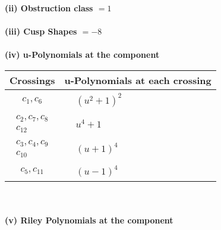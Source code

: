 \documentclass[1p]{elsarticle_modified}
\theoremstyle{definition}
\begin{document}
\flushleft \textbf{(ii) Obstruction class $= 1$}\\~\\
\flushleft \textbf{(iii) Cusp Shapes $= -8$}\\~\\
\newpage\renewcommand{\arraystretch}{1}
\flushleft \textbf{(iv) u-Polynomials at the component}\newline \\
\begin{tabular}{m{50pt}|m{274pt}}
Crossings & \hspace{64pt}u-Polynomials at each crossing \\
\hline $$\begin{aligned}c_{1},c_{6}\end{aligned}$$&$\begin{aligned}
&(u^2+1)^2
\end{aligned}$\\
\hline $$\begin{aligned}c_{2},c_{7},c_{8}\\c_{12}\end{aligned}$$&$\begin{aligned}
&u^4+1
\end{aligned}$\\
\hline $$\begin{aligned}c_{3},c_{4},c_{9}\\c_{10}\end{aligned}$$&$\begin{aligned}
&(u+1)^4
\end{aligned}$\\
\hline $$\begin{aligned}c_{5},c_{11}\end{aligned}$$&$\begin{aligned}
&(u-1)^4
\end{aligned}$\\
\hline
\end{tabular}\\~\\
\newpage\renewcommand{\arraystretch}{1}
\flushleft \textbf{(v) Riley Polynomials at the component}\newline \\
\end{document}

